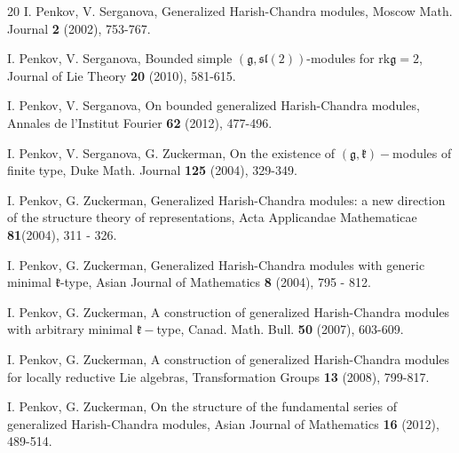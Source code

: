 \documentclass[default]{./styles/svmult}
\newcommand{\rk}{\mathrm{rk}}
\renewcommand{\gg}{\mathfrak{g}}
\newcommand{\kk}{\mathfrak{k}}
\renewcommand{\sl}{\mathfrak{sl}}
\begin{document}
\begin{thebibliography}{20}
 I. Penkov, V. Serganova, Generalized Harish-Chandra modules, Moscow Math. Journal \textbf{2} (2002), 753-767.

\vspace{.25cm}

 I. Penkov, V. Serganova, Bounded simple $(\gg,\sl(2))$-modules for $\rk\gg = 2$, Journal of Lie Theory \textbf{20} (2010), 581-615.

\vspace{.25cm}

 I. Penkov, V. Serganova, On bounded generalized Harish-Chandra modules, Annales de l'Institut Fourier \textbf{62} (2012), 477-496.

\vspace{.25cm}

 I. Penkov, V. Serganova, G. Zuckerman, On the existence of $(\gg,\kk)-$modules of finite type, Duke Math. Journal \textbf{125} (2004), 329-349.

\vspace{.25cm}

 I. Penkov, G. Zuckerman, Generalized Harish-Chandra modules: a new direction of the structure theory of representations, Acta Applicandae Mathematicae \textbf{81}(2004), 311 - 326.

\vspace{.25cm}

 I. Penkov, G. Zuckerman, Generalized Harish-Chandra modules with generic minimal $\kk$-type, Asian Journal of Mathematics \textbf{8} (2004), 795 - 812.

\vspace{.25cm}

 I. Penkov, G. Zuckerman, A construction of generalized Harish-Chandra modules with arbitrary minimal $\kk-$type, Canad. Math. Bull. \textbf{50} (2007), 603-609.

\vspace{.25cm}

 I. Penkov, G. Zuckerman, A construction of generalized Harish-Chandra modules for locally reductive Lie algebras, Transformation Groups \textbf{13} (2008), 799-817.

\vspace{.25cm}

 I. Penkov, G. Zuckerman, On the structure of the fundamental series of generalized Harish-Chandra modules, Asian Journal of Mathematics \textbf{16} (2012), 489-514.


\end{thebibliography}
\end{document}
